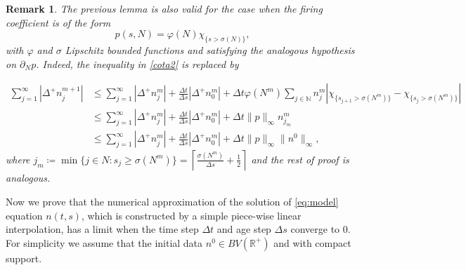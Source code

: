 \documentclass[11pt,a4paper]{article}
\newcommand{\R}{\mathbb{R}}
\newcommand{\N}{\mathbb{N}}
\newtheorem{remark}{Remark}[section]
\begin{document}
\begin{remark}
The previous lemma is also valid for the case when the firing coefficient is of the form
\begin{equation*}
p(s,N)=\varphi(N)\chi_{\{s>\sigma(N)\}},
\end{equation*}
with $\varphi$ and $\sigma$ Lipschitz bounded functions and satisfying the analogous hypothesis on $\partial_N p$. Indeed, the inequality in \eqref{cota2} is replaced by

\begin{equation*}
    \begin{split}
    \sum_{j=1}^\infty|\Delta^{+}n_j^{m+1}|&\le
    \sum_{j=1}^\infty|\Delta^{+}n_j^{m}|
    + \frac{\Delta t}{\Delta s} |\Delta^{+}n_{0}^{m}|+\Delta t\varphi(N^m)\sum_{j\in\N}n^m_j\left|\chi_{\{s_{j+1}>\sigma(N^m)\}}-\chi_{\{s_j>\sigma(N^m)\}}\right|\\
    &\le \sum_{j=1}^\infty|\Delta^{+}n_j^{m}|
    + \frac{\Delta t}{\Delta s} |\Delta^{+}n_{0}^{m}|+\Delta t \|p\|_\infty n^m_{j_m}\\
    &\le \sum_{j=1}^\infty|\Delta^{+}n_j^{m}|
    + \frac{\Delta t}{\Delta s} |\Delta^{+}n_{0}^{m}|+\Delta t \|p\|_\infty\|n^0\|_\infty,
    \end{split}    
\end{equation*}
where $j_m\coloneqq\min\{j\in N\colon s_j\ge \sigma(N^m)\}=\left\lceil\frac{\sigma(N^m)}{\Delta s}+\frac{1}{2}\right\rceil$ and the rest of proof is analogous.
\end{remark}

Now we prove that the numerical approximation of the solution of \eqref{eq:model} equation $n(t,s)$, which is constructed by a simple piece-wise linear interpolation, has a limit when the time step $\Delta t$ and age step $\Delta s$ converge to $0$. For simplicity we assume that the initial data $n^0\in BV(\R^+)$ and with compact support.
\end{document}
